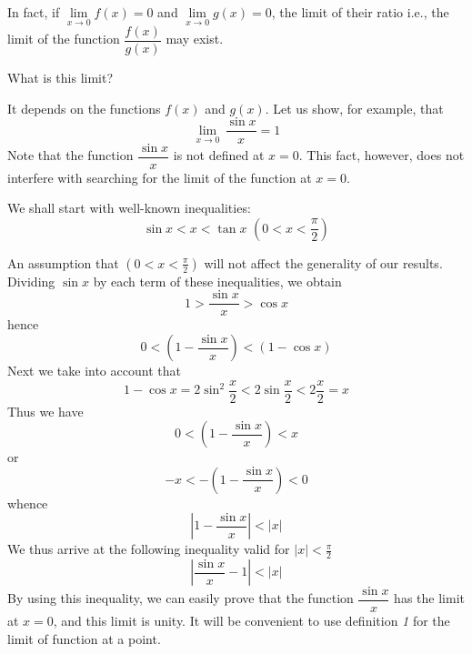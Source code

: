 {\athr In fact, if $\lim\limits_{x \to 0} f(x) = 0$ and $\lim\limits_{x \to 0} g(x) = 0$, the limit of their ratio i.e., the limit of the function $ \dfrac{f(x)}{g(x)}$
may exist. 

\rdr What is this limit? 

\athr It depends on the functions $f(x)$ and $g (x)$.
Let us show, for example, that 
\begin{equation*}%
\boxed{  \lim\limits_{x \to 0} \, \frac{\sin x}{x}  = 1}
\end{equation*}
Note that the function $\dfrac{\sin x}{x} $ is not defined at $x = 0$. This
fact, however, does not interfere with searching for the limit of the function at $x = 0$.

We shall start with well-known inequalities: 
\begin{equation*}%
\sin x < x < \tan x	\,\, \left( 0 < x < \frac{\pi}{2} \right)
\end{equation*}

An assumption that $\left( 0 < x < \frac{\pi}{2} \right)$ will not affect the generality of our results. Dividing $\sin x$ by each term of these inequalities, we obtain 
\begin{equation*}%
1 >   \frac{\sin x}{x}   > \cos x
\end{equation*}
hence
\begin{equation*}%
0 <  \left( 1-  \frac{\sin x}{x}  \right)  < ( 1 -  \cos x)
\end{equation*}
Next we take into account that
\begin{equation*}%
 1 -  \cos x = 2 \sin^{2} \dfrac{x}{2} < 2 \sin \dfrac{x}{2} < 2 \dfrac{x}{2} = x
\end{equation*}
Thus we have
\begin{equation*}%
0 <  \left( 1-  \frac{\sin x}{x}  \right)  < x
\end{equation*}
or 
\begin{equation*}%
-x  <  - \left( 1-  \frac{\sin x}{x}  \right)  < 0
\end{equation*}
whence
\begin{equation*}%
 \left|1 - \frac{\sin x}{x} \right|  < |x|
\end{equation*}
We thus arrive at the following inequality valid for $ |x| < \frac{\pi}{2} $
\begin{equation}%
 \left| \frac{\sin x}{x}  -1 \right|  < |x|
 \label{sinc-limit}
\end{equation}
By using this inequality, we can easily prove that the
function $\dfrac{\sin x}{x}$ has the limit at $x = 0$, and this limit is
unity. It will be convenient to use definition \emph{1} for the limit of function at a point.

}
